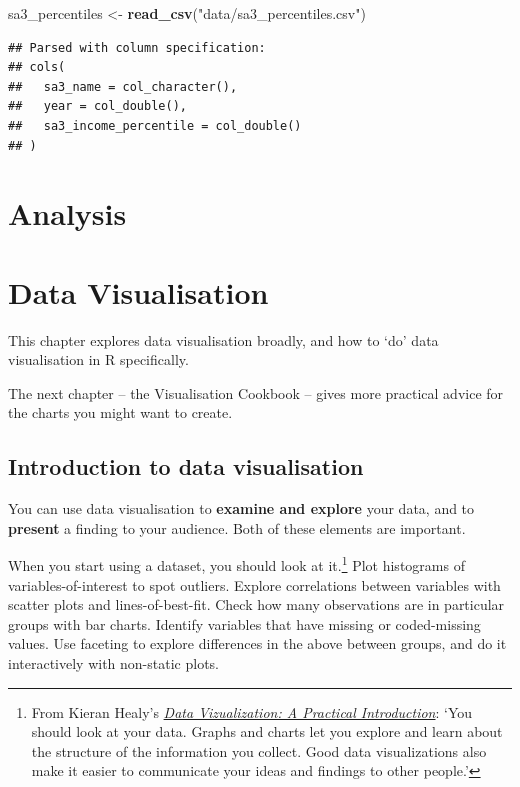 \documentclass[
]{book}
\newenvironment{Shaded}{\begin{snugshade}}{\end{snugshade}}
\newcommand{\KeywordTok}[1]{\textcolor[rgb]{0.13,0.29,0.53}{\textbf{#1}}}
\newcommand{\NormalTok}[1]{#1}
\newcommand{\StringTok}[1]{\textcolor[rgb]{0.31,0.60,0.02}{#1}}
\begin{document}
\begin{Shaded}
\begin{Highlighting}[]
\NormalTok{sa3\_percentiles \textless{}{-}}\StringTok{ }\KeywordTok{read\_csv}\NormalTok{(}\StringTok{"data/sa3\_percentiles.csv"}\NormalTok{)}
\end{Highlighting}
\end{Shaded}

\begin{verbatim}
## Parsed with column specification:
## cols(
##   sa3_name = col_character(),
##   year = col_double(),
##   sa3_income_percentile = col_double()
## )
\end{verbatim}

\hypertarget{analysis}{%
\chapter{Analysis}\label{analysis}}

\hypertarget{data-visualisation}{%
\chapter{Data Visualisation}\label{data-visualisation}}

This chapter explores data visualisation broadly, and how to `do' data visualisation in R specifically.

The next chapter -- the Visualisation Cookbook -- gives more practical advice for the charts you might want to create.

\hypertarget{introduction-to-data-visualisation}{%
\section{Introduction to data visualisation}\label{introduction-to-data-visualisation}}

You can use data visualisation to \textbf{examine and explore} your data, and to \textbf{present} a finding to your audience. Both of these elements are important.

When you start using a dataset, you should look at it.\footnote{From Kieran Healy's \href{https://socviz.co/}{\emph{Data Vizualization: A Practical Introduction}}: `You should look at your data. Graphs and charts let you explore and learn about the structure of the information you collect. Good data visualizations also make it easier to communicate your ideas and findings to other people.'} Plot histograms of variables-of-interest to spot outliers. Explore correlations between variables with scatter plots and lines-of-best-fit. Check how many observations are in particular groups with bar charts. Identify variables that have missing or coded-missing values. Use faceting to explore differences in the above between groups, and do it interactively with non-static plots.
\end{document}
